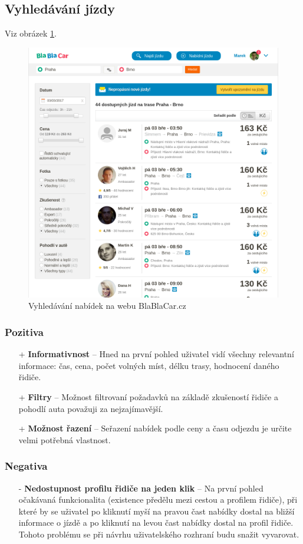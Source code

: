 \subsection{Vyhledávání jízdy}
Viz obrázek \ref{fig:blablacar:search}.
\begin{figure}[h]
    \centering
    \includegraphics[width=1.0\textwidth]{media/blablacar/search.png}
    \caption{Vyhledávání nabídek na webu BlaBlaCar.cz}
    \label{fig:blablacar:search}
\end{figure}
\subsubsection*{Pozitiva}
\begin{itemize}
    \item[+] \textbf{Informativnost} -- Hned na první pohled uživatel vidí všechny relevantní informace: čas, cena, počet volných míst, délku trasy, hodnocení daného řidiče.
    \item[+] \textbf{Filtry} -- Možnost filtrovaní požadavků na základě zkušeností řidiče a pohodlí auta považuji za nejzajímavější.
    \item[+] \textbf{Možnost řazení} -- Seřazení nabídek podle ceny a času odjezdu je určite velmi potřebná vlastnost.
\end{itemize}
\subsubsection*{Negativa}
\begin{itemize}
    \item[-] \textbf{Nedostupnost profilu řidiče na jeden klik} -- Na první pohled očakávaná funkcionalita (existence předělu mezi cestou a profilem řidiče), při které by se uživatel po kliknutí myší na pravou čast nabídky dostal na bližší informace o jízdě a po kliknutí na levou čast nabídky dostal na profil řidiče. Tohoto problému se při návrhu uživatelského rozhraní budu snažit vyvarovat.
\end{itemize}


